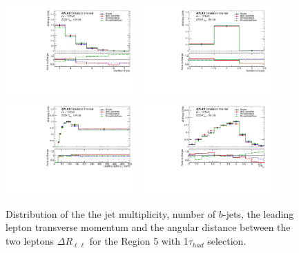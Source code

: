 \begin{figure}[!htb]
\centering
\includegraphics[width=0.45\textwidth]{Plots/ttV/shape/c_Region_4_nJets}
\includegraphics[width=0.45\textwidth]{Plots/ttV/shape/c_Region_4_nBtagJets}\\
\includegraphics[width=0.45\textwidth]{Plots/ttV/shape/c_Region_4_lep_Pt_0} 
\includegraphics[width=0.45\textwidth]{Plots/ttV/shape/c_Region_4_DRll01}\\
  \caption{Distribution of the the jet multiplicity, number of $b$-jets, the leading lepton transverse momentum and the angular distance between the two leptons  $\Delta R _{\ell \ell }$ for the Region 5 with 1$\tau_{had}$ selection. 
   \label{ttV:tauR_kin}}
\end{figure}
% 




